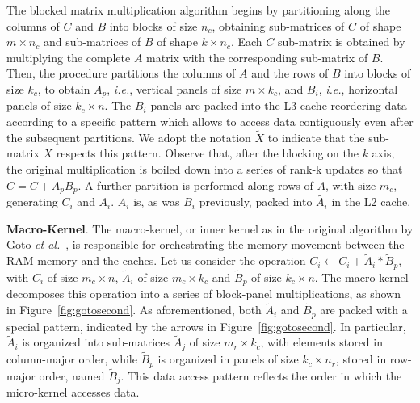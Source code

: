 The blocked matrix multiplication algorithm begins by partitioning along the columns of $C$ and $B$ into blocks of size $n_c$, obtaining  sub-matrices of $C$ of shape $m \times n_c$ and sub-matrices of $B$ of shape $k \times n_c$. Each $C$ sub-matrix is obtained by multiplying the complete $A$ matrix with the corresponding sub-matrix of $B$. Then, the procedure partitions the columns of $A$ and the rows of $B$ into blocks of size $k_c$, to obtain $A_p$, \textit{i.e.}, vertical panels of size $m \times k_c$, and $B_i$, \textit{i.e.}, horizontal panels of size $k_c \times n$. The $B_i$ panels are packed into the L3 cache reordering data according to a specific pattern which allows to access data contiguously even after the subsequent partitions.  We adopt the notation $\tilde{X}$ to indicate that the sub-matrix $X$ respects this pattern. Observe that, after the blocking on the $k$ axis, the original multiplication is boiled down into a series of rank-k updates so that $C = C + A_p B_p$. A further partition is performed along rows of $A$, with size $m_c$, generating $C_i$ and $A_i$. $A_i$ is, as was $B_i$ previously, packed into $\tilde{A_i}$ in the L2 cache.



\noindent \textbf{Macro-Kernel}. The macro-kernel, or inner kernel as in the original algorithm by Goto \textit{et al.}~\cite{goto2008anatomy}, is responsible for orchestrating the memory movement between the RAM memory and the caches. Let us consider the operation $C_i \leftarrow C_i +  \tilde{A}_i*  \tilde{B}_p $, with $C_i$ of size $m_c \times n$, $\tilde{A}_i$ of size $m_c \times k_c$ and $\tilde{B}_p$ of size $k_c \times n$. The macro kernel decomposes this operation into a series of block-panel multiplications, as shown in Figure~\ref{fig:gotosecond}. As aforementioned, both $\tilde{A}_i$ and $ \tilde{B}_p$ are packed with a special pattern, indicated by the arrows in Figure~\ref{fig:gotosecond}. In particular, $\tilde{A}_i$ is organized into sub-matrices $\tilde{A}_j$ of size $m_r \times k_c$, with elements stored in column-major order, while $ \tilde{B}_p$ is organized in panels of size $k_c \times n_r$, stored in row-major order, named $\tilde{B}_j$. This data access pattern reflects the order in which the micro-kernel accesses data. 

